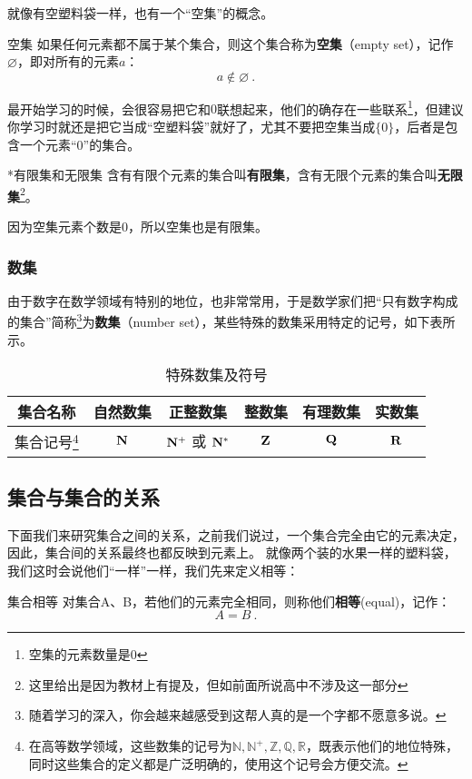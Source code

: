 就像有空塑料袋一样，也有一个“空集”的概念。

\begin{definition}{空集}
如果任何元素都不属于某个集合，则这个集合称为\textbf{空集}（empty set），记作 $\varnothing$，即对所有的元素$a$：
\begin{equation}
a\notin\varnothing~.
\end{equation}
\end{definition}

最开始学习的时候，会很容易把它和$0$联想起来，他们的确存在一些联系\footnote{空集的元素数量是0}，但建议你学习时就还是把它当成“空塑料袋”就好了，尤其不要把空集当成$\{0\}$，后者是包含一个元素“$0$”的集合。

\begin{definition}{*有限集和无限集}
含有有限个元素的集合叫\textbf{有限集}，含有无限个元素的集合叫\textbf{无限集}\footnote{这里给出是因为教材上有提及，但如前面所说高中不涉及这一部分}。
\end{definition}

因为空集元素个数是0，所以空集也是有限集。

\subsubsection{数集}

由于数字在数学领域有特别的地位，也非常常用，于是数学家们把“只有数字构成的集合”简称\footnote{随着学习的深入，你会越来越感受到这帮人真的是一个字都不愿意多说。}为\textbf{数集}（number set），某些特殊的数集采用特定的记号，如下表所示。

\begin{table}[ht]
\centering
\caption{特殊数集及符号}\label{tab_HsSet2}
\begin{tabular}{|c|c|c|c|c|c|}
\hline
集合名称 &自然数集  &正整数集  & 整数集 & 有理数集& 实数集 \\
\hline
集合记号\footnote{在高等数学领域，这些数集的记号为$\mathbb{N,N^+,Z,Q,R}$，既表示他们的地位特殊，同时这些集合的定义都是广泛明确的，使用这个记号会方便交流。} & ${\rm \mathbf{N}}$ & ${\rm \mathbf{N^+}}$ 或 ${\rm \mathbf{N^*}}$ & ${\rm \mathbf{Z}}$ & ${\rm \mathbf{Q}}$ & ${\rm \mathbf{R}}$ \\
\hline
\end{tabular}
\end{table}

\subsection{集合与集合的关系}\label{sub_HsSet_1}
下面我们来研究集合之间的关系，之前我们说过，一个集合完全由它的元素决定，因此，集合间的关系最终也都反映到元素上。
就像两个装的水果一样的塑料袋，我们这时会说他们“一样”一样，我们先来定义相等：
\begin{definition}{集合相等}
对集合A、B，若他们的元素完全相同，则称他们\textbf{相等}(equal)，记作：
\begin{equation}
A=B~.
\end{equation}
\end{definition}

